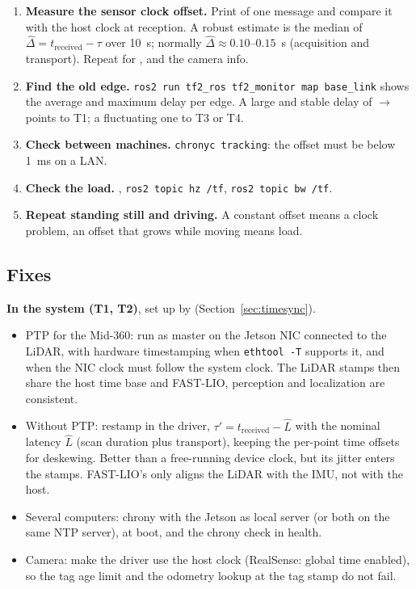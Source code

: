 \begin{enumerate}
  \item \textbf{Measure the sensor clock offset.} Print  of one
     message and compare it with the host clock at reception. A robust
    estimate is the median of $\hat\Delta = t_{\mathrm{received}} - \tau$ over 10~s; normally
    $\hat\Delta \approx 0.10$--$0.15$~s (acquisition and transport). Repeat for
    ,  and the camera info.
  \item \textbf{Find the old edge.} \texttt{ros2 run tf2\_ros tf2\_monitor map base\_link} shows the
    average and maximum delay per edge. A large and stable delay of
    $\to$ points to T1; a fluctuating one to T3 or T4.
  \item \textbf{Check between machines.} \texttt{chronyc tracking}: the offset must be below 1~ms on
    a LAN.
  \item \textbf{Check the load.} , \texttt{ros2 topic hz /tf},
    \texttt{ros2 topic bw /tf}.
  \item \textbf{Repeat standing still and driving.} A constant offset means a clock problem, an
    offset that grows while moving means load.
\end{enumerate}

\subsection{Fixes}

\textbf{In the system (T1, T2)}, set up by  (Section~\ref{sec:timesync}).
\begin{itemize}
  \item PTP for the Mid-360: run  as master on the Jetson NIC connected to the LiDAR,
    with hardware timestamping when \texttt{ethtool -T} supports it, and  when the NIC
    clock must follow the system clock. The LiDAR stamps then share the host time base and
    FAST-LIO, perception and localization are consistent.
  \item Without PTP: restamp in the driver, $\tau' = t_{\mathrm{received}} - \hat L$ with the nominal
    latency $\hat L$ (scan duration plus transport), keeping the per-point time offsets for
    deskewing. Better than a free-running device clock, but its jitter enters the stamps.
    FAST-LIO's  only aligns the LiDAR with the IMU, not with the host.
  \item Several computers: chrony with the Jetson as local server (or both on the same NTP server),
     at boot, and the chrony check in health.
  \item Camera: make the driver use the host clock (RealSense: global time enabled), so the tag age
    limit and the odometry lookup at the tag stamp do not fail.
\end{itemize}

